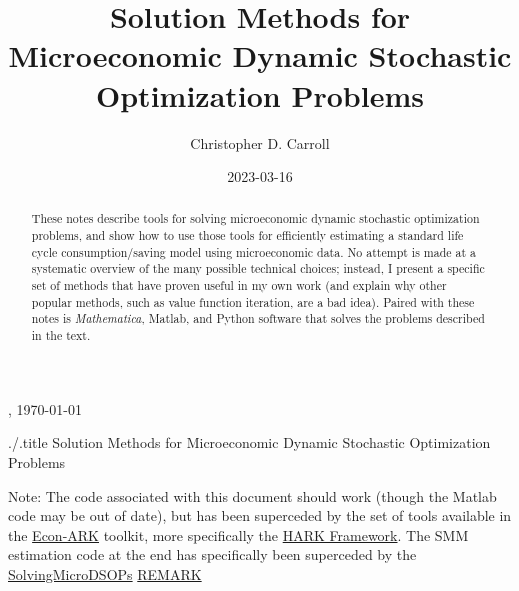 \documentclass[titlepage, headings=optiontotocandhead]{\econtex}
\begin{document}
\renewcommand{\onlyinsubfile}[1]{}\renewcommand{\notinsubfile}[1]{#1}

\hfill{\tiny \jobname, \today}

\begin{verbatimwrite}{./\texname.title}
  Solution Methods for Microeconomic Dynamic Stochastic Optimization Problems
\end{verbatimwrite}

\title{Solution Methods for Microeconomic Dynamic Stochastic Optimization Problems}

\author{Christopher D. Carroll\authNum}


\date{2023-03-16}
\maketitle

\noindent  Note: The code associated with this document should work (though the Matlab code may be out of date), but has been superceded by the set of tools available in the \href{https://github.com/econ-ark/HARK}{Econ-ARK} toolkit, more specifically the \href{https://github.com/econ-ark/HARK}{HARK Framework}.  The SMM estimation code at the end has specifically been superceded by the \href{https://econ-ark.org/materials/solvingmicrodsops?launch}{SolvingMicroDSOPs} \href{https://github.com/econ-ark/REMARK}{REMARK}


\hypertarget{Abstract}{}
\begin{abstract}
  These notes describe tools for solving microeconomic dynamic stochastic optimization problems, and show how to use those tools for efficiently estimating a standard life cycle consumption/saving model using microeconomic data.  No attempt is made at a systematic overview of the many possible technical choices; instead, I present a specific set of methods that have proven useful in my own work (and explain why other popular methods, such as value function iteration, are a bad idea).  Paired with these notes is \textit{Mathematica}, Matlab, and Python software that solves the problems described in the text.
\end{abstract}
\end{document}
